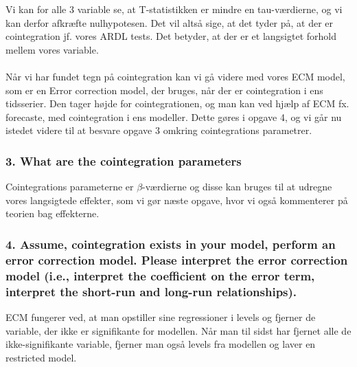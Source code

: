 \documentclass[
  10pt,
]{article}
\begin{document}
Vi kan for alle 3 variable se, at T-statistikken er mindre en
tau-værdierne, og vi kan derfor afkræfte nulhypotesen. Det vil altså
sige, at det tyder på, at der er cointegration jf. vores ARDL tests. Det
betyder, at der er et langsigtet forhold mellem vores variable.\\
~\\
Når vi har fundet tegn på cointegration kan vi gå videre med vores ECM
model, som er en Error correction model, der bruges, når der er
cointegration i ens tidsserier. Den tager højde for cointegrationen, og
man kan ved hjælp af ECM fx. forecaste, med cointegration i ens
modeller. Dette gøres i opgave 4, og vi går nu istedet videre til at
besvare opgave 3 omkring cointegrations parametrer.

\hypertarget{what-are-the-cointegration-parameters}{%
\subsubsection{3. What are the cointegration
parameters}\label{what-are-the-cointegration-parameters}}

Cointegrations parameterne er \(\beta\)-værdierne og disse kan bruges
til at udregne vores langsigtede effekter, som vi gør næste opgave, hvor
vi også kommenterer på teorien bag effekterne.

\newpage

\hypertarget{assume-cointegration-exists-in-your-model-perform-an-error-correction-model.-please-interpret-the-error-correction-model-i.e.-interpret-the-coefficient-on-the-error-term-interpret-the-short-run-and-long-run-relationships.}{%
\subsubsection{4. Assume, cointegration exists in your model, perform an
error correction model. Please interpret the error correction model
(i.e., interpret the coefficient on the error term, interpret the
short-run and long-run
relationships).}\label{assume-cointegration-exists-in-your-model-perform-an-error-correction-model.-please-interpret-the-error-correction-model-i.e.-interpret-the-coefficient-on-the-error-term-interpret-the-short-run-and-long-run-relationships.}}

ECM fungerer ved, at man opstiller sine regressioner i levels og fjerner
de variable, der ikke er signifikante for modellen. Når man til sidst
har fjernet alle de ikke-signifikante variable, fjerner man også levels
fra modellen og laver en restricted model.~
\end{document}
